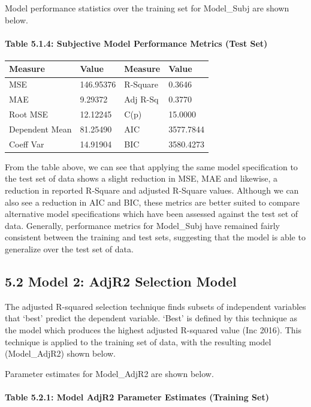 \documentclass[]{article}
\let\oldparagraph\paragraph
\renewcommand{\paragraph}[1]{\oldparagraph{#1}\mbox{}}
\begin{document}
Model performance statistics over the training set for Model\_Subj are
shown below.

\paragraph{Table 5.1.4: Subjective Model Performance Metrics (Test
Set)}\label{table-5.1.4-subjective-model-performance-metrics-test-set}

\begin{longtable}[]{@{}llll@{}}
\toprule
Measure & Value & Measure & Value\tabularnewline
\midrule
\endhead
MSE & 146.95376 & R-Square & 0.3646\tabularnewline
MAE & 9.29372 & Adj R-Sq & 0.3770\tabularnewline
Root MSE & 12.12245 & C(p) & 15.0000\tabularnewline
Dependent Mean & 81.25490 & AIC & 3577.7844\tabularnewline
Coeff Var & 14.91904 & BIC & 3580.4273\tabularnewline
\bottomrule
\end{longtable}

From the table above, we can see that applying the same model
specification to the test set of data shows a slight reduction in MSE,
MAE and likewise, a reduction in reported R-Square and adjusted R-Square
values. Although we can also see a reduction in AIC and BIC, these
metrics are better suited to compare alternative model specifications
which have been assessed against the test set of data. Generally,
performance metrics for Model\_Subj have remained fairly consistent
between the training and test sets, suggesting that the model is able to
generalize over the test set of data.

\subsection{5.2 Model 2: AdjR2 Selection
Model}\label{model-2-adjr2-selection-model}

The adjusted R-squared selection technique finds subsets of independent
variables that `best' predict the dependent variable. `Best' is defined
by this technique as the model which produces the highest adjusted
R-squared value (Inc 2016). This technique is applied to the training
set of data, with the resulting model (Model\_AdjR2) shown below.

Parameter estimates for Model\_AdjR2 are shown below.

\paragraph{Table 5.2.1: Model AdjR2 Parameter Estimates (Training
Set)}\label{table-5.2.1-model-adjr2-parameter-estimates-training-set}
\end{document}
